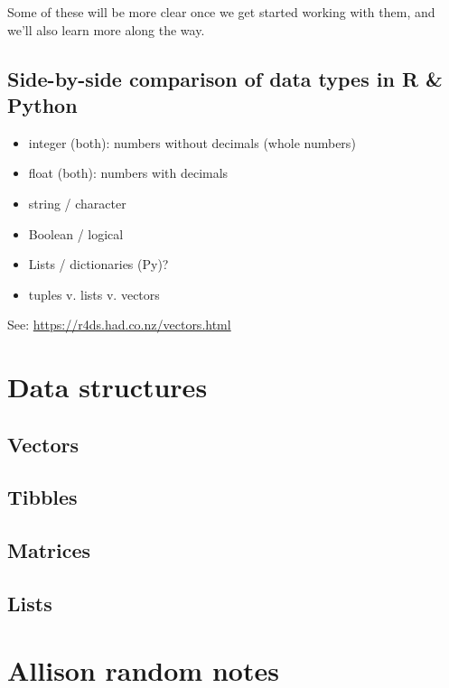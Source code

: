 \documentclass[
]{book}
\providecommand{\tightlist}{%
  \setlength{\itemsep}{0pt}\setlength{\parskip}{0pt}}
\begin{document}
Some of these will be more clear once we get started working with them, and we'll also learn more along the way.

\hypertarget{side-by-side-comparison-of-data-types-in-r-python}{%
\subsection{Side-by-side comparison of data types in R \& Python}\label{side-by-side-comparison-of-data-types-in-r-python}}

\begin{itemize}
\tightlist
\item
  integer (both): numbers without decimals (whole numbers)
\item
  float (both): numbers with decimals
\item
  string / character
\item
  Boolean / logical
\item
  Lists / dictionaries (Py)?
\item
  tuples v. lists v. vectors
\end{itemize}

See: \url{https://r4ds.had.co.nz/vectors.html}

\hypertarget{data-structures}{%
\section{Data structures}\label{data-structures}}

\hypertarget{vectors}{%
\subsection{Vectors}\label{vectors}}

\hypertarget{tibbles}{%
\subsection{Tibbles}\label{tibbles}}

\hypertarget{matrices}{%
\subsection{Matrices}\label{matrices}}

\hypertarget{lists}{%
\subsection{Lists}\label{lists}}

\hypertarget{allison-random-notes}{%
\section{Allison random notes}\label{allison-random-notes}}
\end{document}
